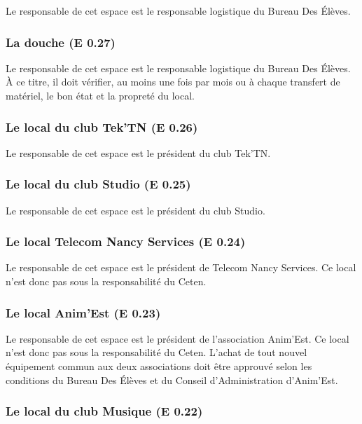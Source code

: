 \documentclass{article} %
\begin{document}
			Le responsable de cet espace est le responsable logistique du
			Bureau Des Élèves.

			\subsubsection{La douche (E 0.27)}

				Le responsable de cet espace est le responsable logistique du
				Bureau Des Élèves. À ce titre, il doit vérifier, au moins une
				fois par mois ou à chaque transfert de matériel, le bon état et
				la propreté du local.

			\subsubsection{Le local du club Tek’TN (E 0.26)}

				Le responsable de cet espace est le président du club Tek’TN. 

			\subsubsection{Le local du club Studio (E 0.25)}

				Le responsable de cet espace est le président du club Studio. 

			\subsubsection{Le local Telecom Nancy Services (E 0.24)}

				Le responsable de cet espace est le président de Telecom Nancy
				Services. Ce local n’est donc pas sous la responsabilité du
				Ceten.

			\subsubsection{Le local Anim’Est (E 0.23)}

				Le responsable de cet espace est le président de l’association
				Anim’Est. Ce local n’est donc pas sous la responsabilité du
				Ceten. L’achat de tout nouvel équipement commun aux deux
				associations doit être approuvé selon les conditions du Bureau
				Des Élèves et du Conseil d'Administration d’Anim’Est.

			\subsubsection{Le local du club Musique (E 0.22)}
\end{document}
